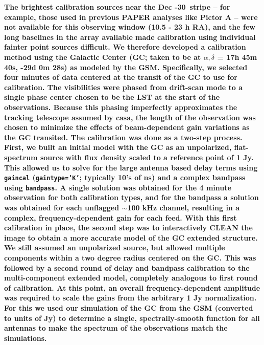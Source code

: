 \documentclass[twocolumn, trackchanges]{aastex61}
\newcommand{\casa}{{\sc casa}}
\newcommand{\edited}[1]{{\bf \color{blue} #1}}
\begin{document}
\edited{The brightest calibration sources near the Dec -30\arcdeg\ stripe -- for example, those used in previous PAPER analyses like Pictor A \citep{jacobs13b} -- were not available for this observing window (10.5 - 23 h RA), and the few long baselines in the array available made calibration using individual fainter point sources difficult.  We therefore developed a calibration method using the Galactic Center (GC; taken to be at $\alpha, \delta$ = 17h 45m 40s, -29d 0m 28s) as modeled by the GSM. Specifically, we selected four minutes of data centered at the transit of the GC to use for calibration.   The visibilities were phased from drift-scan mode to a single phase center chosen to be the LST at the start of the observations.  Because this phasing imperfectly approximates the tracking telescope assumed by \casa, the length of the observation was chosen to minimize the effects of beam-dependent gain variations as the GC transited.  The calibration was done as a two-step process.  First, we built an initial model with the GC as an unpolarized, flat-spectrum source with flux density scaled to a reference point of 1 Jy.  This allowed us to solve for the large antenna based delay terms using {\tt gaincal} ({\tt gaintype='K'}; typically 10's of ns) and a complex bandpass using {\tt bandpass}.  A single solution was obtained for the 4 minute observation for both calibration types, and for the bandpass a solution was obtained for each unflagged $\sim$100 kHz channel, resulting in a complex, frequency-dependent gain for each feed.	With this first calibration in place, the second step was to interactively CLEAN the image to obtain a more accurate model of the GC extended structure.  We still assumed an unpolarized source, but allowed multiple components within a two degree radius centered on the GC.  This was followed by a second round of delay and bandpass calibration to the multi-component extended model, completely analogous to first round of calibration.  At this point, an overall frequency-dependent amplitude was required to scale the gains from the arbitrary 1 Jy normalization.  For this we used our simulation of the GC from the GSM (converted to units of Jy) to determine a single, spectrally-smooth function for all antennas to make the spectrum of the observations match the simulations.

}
\end{document}
